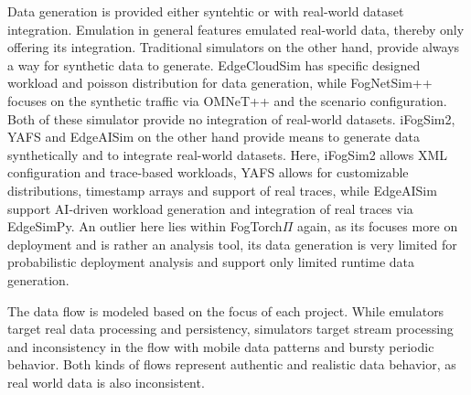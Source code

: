 Data generation is provided either syntehtic or with real-world dataset integration.
Emulation in general features emulated real-world data, thereby only offering its integration.
Traditional simulators on the other hand, provide always a way for synthetic data to generate.
EdgeCloudSim has specific designed workload and poisson distribution for data generation, while FogNetSim++ focuses on the synthetic traffic via OMNeT++ and the scenario configuration.
Both of these simulator provide no integration of real-world datasets.
iFogSim2, YAFS and EdgeAISim on the other hand provide means to generate data synthetically and to integrate real-world datasets.
Here, iFogSim2 allows XML configuration and trace-based workloads, YAFS allows for customizable distributions, timestamp arrays and support of real traces, while EdgeAISim support AI-driven workload generation and integration of real traces via EdgeSimPy.
An outlier here lies within FogTorch$\Pi$ again, as its focuses more on deployment and is rather an analysis tool, its data generation is very limited for probabilistic deployment analysis and support only limited runtime data generation.

The data flow is modeled based on the focus of each project. 
While emulators target real data processing and persistency, simulators target stream processing and inconsistency in the flow with mobile data patterns and bursty periodic behavior.
Both kinds of flows represent authentic and realistic data behavior, as real world data is also inconsistent.

